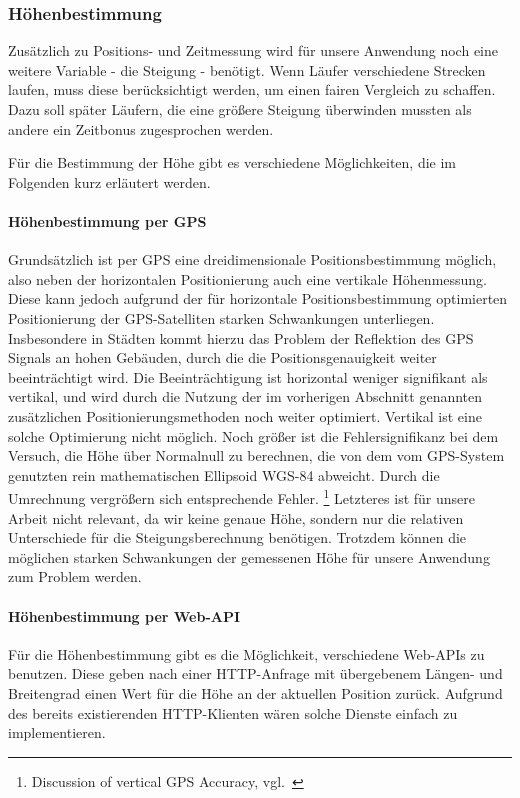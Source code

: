 \subsubsection{Höhenbestimmung}
Zusätzlich zu Positions- und Zeitmessung wird für unsere Anwendung noch eine weitere Variable - die Steigung - benötigt. Wenn Läufer verschiedene Strecken laufen, muss diese berücksichtigt werden, um einen fairen Vergleich zu schaffen. Dazu soll später Läufern, die eine größere Steigung überwinden mussten als andere ein Zeitbonus zugesprochen werden.

Für die Bestimmung der Höhe gibt es verschiedene Möglichkeiten, die im Folgenden kurz erläutert werden.
\paragraph{Höhenbestimmung per GPS}
Grundsätzlich ist per GPS eine dreidimensionale Positionsbestimmung möglich, also neben der horizontalen Positionierung auch eine vertikale Höhenmessung. Diese kann jedoch aufgrund der für horizontale Positionsbestimmung optimierten Positionierung der GPS-Satelliten starken Schwankungen unterliegen. Insbesondere in Städten kommt hierzu das Problem der Reflektion des GPS Signals an hohen Gebäuden, durch die die Positionsgenauigkeit weiter beeinträchtigt wird. Die Beeinträchtigung ist horizontal weniger signifikant als vertikal, und wird durch die Nutzung der im vorherigen Abschnitt genannten zusätzlichen Positionierungsmethoden noch weiter optimiert. Vertikal ist eine solche Optimierung nicht möglich. Noch größer ist die Fehlersignifikanz bei dem Versuch, die Höhe über Normalnull zu berechnen, die von dem vom GPS-System genutzten rein mathematischen Ellipsoid WGS-84 abweicht. Durch die Umrechnung vergrößern sich entsprechende Fehler. \footnote{Discussion of vertical GPS Accuracy, vgl.~\cite{gladstone}} Letzteres ist für unsere Arbeit nicht relevant, da wir keine genaue Höhe, sondern nur die relativen Unterschiede für die Steigungsberechnung benötigen. Trotzdem können die möglichen starken Schwankungen der gemessenen Höhe für unsere Anwendung zum Problem werden.
\paragraph{Höhenbestimmung per Web-API}
Für die Höhenbestimmung gibt es die Möglichkeit, verschiedene Web-APIs zu benutzen. Diese geben nach einer HTTP-Anfrage mit übergebenem Längen- und Breitengrad einen Wert für die Höhe an der aktuellen Position zurück. Aufgrund des bereits existierenden HTTP-Klienten wären solche Dienste einfach zu implementieren.

